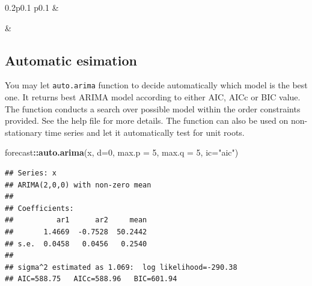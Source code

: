 \documentclass[]{book}
\newenvironment{Shaded}{\begin{snugshade}}{\end{snugshade}}
\newcommand{\DataTypeTok}[1]{\textcolor[rgb]{0.13,0.29,0.53}{#1}}
\newcommand{\DecValTok}[1]{\textcolor[rgb]{0.00,0.00,0.81}{#1}}
\newcommand{\KeywordTok}[1]{\textcolor[rgb]{0.13,0.29,0.53}{\textbf{#1}}}
\newcommand{\NormalTok}[1]{#1}
\newcommand{\OperatorTok}[1]{\textcolor[rgb]{0.81,0.36,0.00}{\textbf{#1}}}
\newcommand{\StringTok}[1]{\textcolor[rgb]{0.31,0.60,0.02}{#1}}
\begin{document}
\begin{table}[h]
\begin{raggedright}
\begin{threeparttable}
\begin{tabularx}{0.2\textwidth}{p{} p{}}
 &
 \tabularnewline[-0.5pt]



 &
 \tabularnewline[-0.5pt]


\end{tabularx}\end{threeparttable}
\par\end{raggedright}

\end{table}
 

\hypertarget{automatic-esimation}{%
\subsection{Automatic esimation}\label{automatic-esimation}}

You may let \texttt{auto.arima} function to decide automatically which model is the best one. It returns best ARIMA model according to either AIC, AICc or BIC value. The function conducts a search over possible model within the order constraints provided. See the help file for more details. The function can also be used on non-stationary time series and let it automatically test for unit roots.

\begin{Shaded}
\begin{Highlighting}[]
\NormalTok{forecast}\OperatorTok{::}\KeywordTok{auto.arima}\NormalTok{(x, }\DataTypeTok{d=}\DecValTok{0}\NormalTok{, }\DataTypeTok{max.p =} \DecValTok{5}\NormalTok{, }\DataTypeTok{max.q =} \DecValTok{5}\NormalTok{, }\DataTypeTok{ic=}\StringTok{"aic"}\NormalTok{)}
\end{Highlighting}
\end{Shaded}

\begin{verbatim}
## Series: x 
## ARIMA(2,0,0) with non-zero mean 
## 
## Coefficients:
##          ar1      ar2     mean
##       1.4669  -0.7528  50.2442
## s.e.  0.0458   0.0456   0.2540
## 
## sigma^2 estimated as 1.069:  log likelihood=-290.38
## AIC=588.75   AICc=588.96   BIC=601.94
\end{verbatim}
\end{document}
